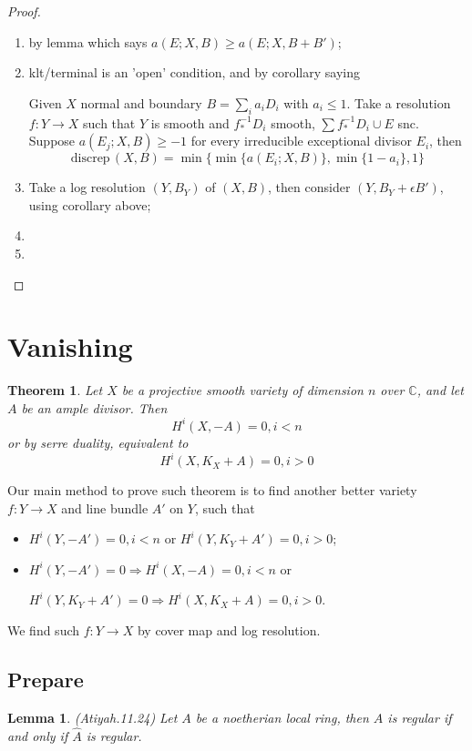 \documentclass{article}
\newtheorem{lem}[defn]{Lemma}
\newtheorem{thm}[defn]{Theorem}
\begin{document}
\begin{proof}
  \begin{enumerate}
    \item by lemma which says $ a(E;X,B)\geqslant a(E;X,B+B') $;
    \item klt/terminal is an 'open' condition, and by corollary saying
    
    Given  $ X $ normal and boundary $ B=\sum_ia_iD_i $ with $ a_i\leqslant 1 $. Take a resolution $ f:Y\to X $ such that $ Y $ is smooth and $ f^{-1}_*D_i $ smooth, $ \sum f^{-1}_*D_i \cup E$ snc. Suppose $ a(E_j;X,B)\geqslant -1 $ for every irreducible exceptional divisor $ E_i $, then
    \[ \mathrm{discrep}\, (X,B)=\min\{\min\{a(E_i;X,B)\},\min\{1-a_i\},1\} \]
    \item Take a log resolution $ (Y,B_Y) $ of $ (X,B) $, then consider $ (Y,B_Y+\epsilon B') $, using corollary above;
    \item 
    \item  
  \end{enumerate}
\end{proof}

\section{Vanishing}

\begin{thm}
  Let $ X $ be a projective smooth variety of dimension $ n $ over $ \mathbb{C} $, and let  $ A $ be an ample divisor. Then
  \[ H^i(X,-A)=0,i<n \]
  or by serre duality, equivalent to
  \[ H^i(X,K_X+A)=0,i>0  \]
\end{thm}

Our main method to prove such theorem is to find another better variety $ f:Y\to X $ and line bundle $ A' $ on $ Y $, such that
\begin{itemize}
  \item $ H^i(Y,-A')=0,i<n  $ or $ H^i(Y,K_Y+A')=0,i>0  $;
  \item $ H^i(Y,-A')=0 \Rightarrow H^i(X,-A)=0,i<n  $  or
  
  $ H^i(Y,K_Y+A')=0 \Rightarrow  H^i(X,K_X+A)=0,i>0 $.
\end{itemize}
 We find such $ f:Y\to X $ by cover map and log resolution.

\subsection{Prepare}
\begin{lem}
  (Atiyah.11.24) Let $ A $ be a noetherian local ring, then $ A $ is regular if and only if $ \hat{A} $ is regular.
\end{lem}
\end{document}
